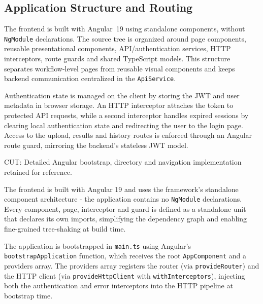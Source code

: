 \subsection{Application Structure and Routing}
\label{subsec:frontend-structure}

\par The frontend is built with Angular~19 using standalone components, without \texttt{NgModule} declarations. The source tree is organized around page components, reusable presentational components, API/authentication services, HTTP interceptors, route guards and shared TypeScript models. This structure separates workflow-level pages from reusable visual components and keeps backend communication centralized in the \texttt{ApiService}.

\par Authentication state is managed on the client by storing the JWT and user metadata in browser storage. An HTTP interceptor attaches the token to protected API requests, while a second interceptor handles expired sessions by clearing local authentication state and redirecting the user to the login page. Access to the upload, results and history routes is enforced through an Angular route guard, mirroring the backend's stateless JWT model.

\iffalse
CUT: Detailed Angular bootstrap, directory and navigation implementation retained for reference.
 \par The frontend is built with Angular 19 and uses the framework's standalone component architecture - the application contains no \texttt{NgModule} declarations. Every component, page, interceptor and guard is defined as a standalone unit that declares its own imports, simplifying the dependency graph and enabling fine-grained tree-shaking at build time.

The application is bootstrapped in \texttt{main.ts} using Angular's \texttt{bootstrapA\-ppli\-ca\-tion} function, which receives the root \texttt{AppComponent} and a providers array. The providers array registers the router (via \texttt{provideRouter}) and the HTTP client (via \texttt{pro\-vid\-eHttp\-Client} with \texttt{withInterceptors}), injecting both the authentication and error interceptors into the HTTP pipeline at bootstrap time.

